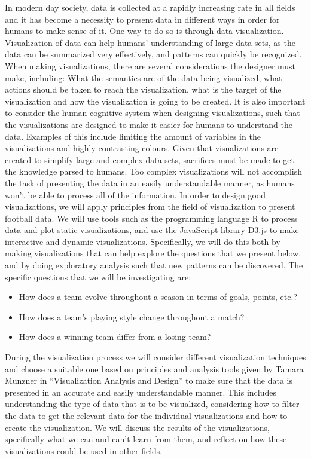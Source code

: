\documentclass[Report.tex]{subfiles}
\begin{document}
In modern day society, data is collected at a rapidly increasing rate in all fields and it has become a necessity to present data in different ways in order for humans to make sense of it. One way to do so is through data visualization. Visualization of data can help humans' understanding of large data sets, as the data can be summarized very effectively, and patterns can quickly be recognized. When making visualizations, there are several considerations the designer must make, including: What the semantics are of the data being visualized, what actions should be taken to reach the visualization, what is the target of the visualization and how the visualization is going to be created. It is also important to consider the human cognitive system when designing visualizations, such that the visualizations are designed to make it easier for humans to understand the data. Examples of this include limiting the amount of variables in the visualizations and highly contrasting colours. Given that visualizations are created to simplify large and complex data sets, sacrifices must be made to get the knowledge parsed to humans. Too complex visualizations will not accomplish the task of presenting the data in an easily understandable manner, as humans won’t be able to process all of the information. 
In order to design good visualizations, we will apply principles from the field of visualization to present football data. We will use tools such as the programming language R to process data and plot static visualizations, and use the JavaScript library D3.js to make interactive and dynamic visualizations. 
Specifically, we will do this both by making visualizations that can help explore the questions that we present below, and by doing exploratory analysis such that new patterns can be discovered. The specific questions that we will be investigating are: 
\begin{itemize}
\item How does a team evolve throughout a season in terms of goals, points,
etc.?
\item How does a team’s playing style change throughout a match?
\item How does a winning team differ from a losing team?
\end{itemize}
During the visualization process we will consider different visualization techniques and choose a suitable one based on principles and analysis tools given by Tamara Munzner in “Visualization Analysis and Design” to make sure that the data is presented in an accurate and easily understandable manner. This includes understanding the type of data that is to be visualized, considering how to filter the data to get the relevant data for the individual visualizations and how to create the visualization. We will discuss the results of the visualizations, specifically what we can and can’t learn from them, and reflect on how these visualizations could be used in other fields.
\end{document}
